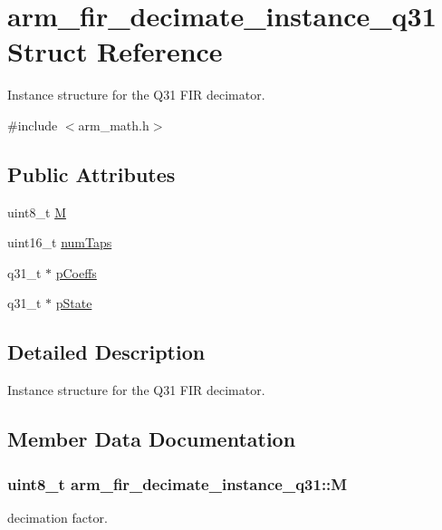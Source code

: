 \hypertarget{structarm__fir__decimate__instance__q31}{}\section{arm\+\_\+fir\+\_\+decimate\+\_\+instance\+\_\+q31 Struct Reference}
\label{structarm__fir__decimate__instance__q31}


Instance structure for the Q31 F\+IR decimator.  




{\ttfamily \#include $<$arm\+\_\+math.\+h$>$}

\subsection*{Public Attributes}
\begin{DoxyCompactItemize}
\item 
uint8\+\_\+t \hyperlink{structarm__fir__decimate__instance__q31_ad3d6936c36303b30dd38f1eddf248ae5}{M}
\item 
uint16\+\_\+t \hyperlink{structarm__fir__decimate__instance__q31_a37915d42b0dc5e3057ebe83110798482}{num\+Taps}
\item 
q31\+\_\+t $\ast$ \hyperlink{structarm__fir__decimate__instance__q31_a030d0391538c2481c5b348fd09a952ff}{p\+Coeffs}
\item 
q31\+\_\+t $\ast$ \hyperlink{structarm__fir__decimate__instance__q31_a0ef0ef9e265f7ab873cfc6daa7593fdb}{p\+State}
\end{DoxyCompactItemize}


\subsection{Detailed Description}
Instance structure for the Q31 F\+IR decimator. 

\subsection{Member Data Documentation}
\subsubsection[{\texorpdfstring{M}{M}}]{\setlength{\rightskip}{0pt plus 5cm}uint8\+\_\+t arm\+\_\+fir\+\_\+decimate\+\_\+instance\+\_\+q31\+::M}\hypertarget{structarm__fir__decimate__instance__q31_ad3d6936c36303b30dd38f1eddf248ae5}{}\label{structarm__fir__decimate__instance__q31_ad3d6936c36303b30dd38f1eddf248ae5}
decimation factor. 
